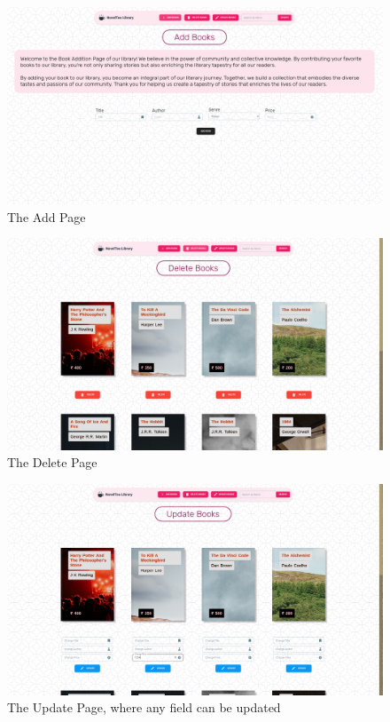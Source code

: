 \documentclass[11pt]{article}
\begin{document}
\begin{figure}[H]
    \centering
    \includegraphics[width=.95\textwidth]{Screenshots/add.png}
    \caption{The Add Page}
\end{figure}

\begin{figure}[H]
    \centering
    \includegraphics[width=.95\textwidth]{Screenshots/delete.png}
    \caption{The Delete Page}
\end{figure}
\begin{figure}[H]

    \centering
    \includegraphics[width=.95\textwidth]{Screenshots/update.png}
    \caption{The Update Page, where any field can be updated}
\end{figure}
\end{document}
